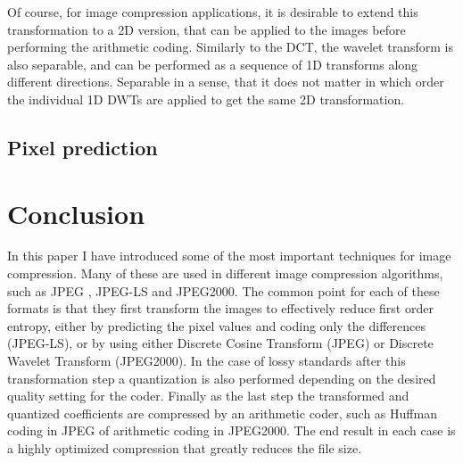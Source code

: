 Of course, for image compression applications, it is desirable to extend this transformation to a 2D version, that can be applied to the images before performing the arithmetic coding. Similarly to the DCT, the wavelet transform is also separable, and can be performed as a sequence of 1D transforms along different directions. Separable in a sense, that it does not matter in which order the individual 1D DWTs are applied to get the same 2D transformation.

\subsection{Pixel prediction}



\section{Conclusion}
In this paper I have introduced some of the most important techniques for image compression. Many of these are used in different image compression algorithms, such as JPEG \cite{pennebaker_jpeg:_1992}, JPEG-LS \cite{weinberger_loco-i_2000} and JPEG2000. The common point for each of these formats is that they first transform the images to effectively reduce first order entropy, either by predicting the pixel values and coding only the differences (JPEG-LS), or by using either Discrete Cosine Transform (JPEG) or Discrete Wavelet Transform (JPEG2000). In the case of lossy standards after this transformation step a quantization is also performed depending on the desired quality setting for the coder. Finally as the last step the transformed and quantized coefficients are compressed by an arithmetic coder, such as Huffman coding in JPEG of arithmetic coding in JPEG2000. The end result in each case is a highly optimized compression that greatly reduces the file size.

